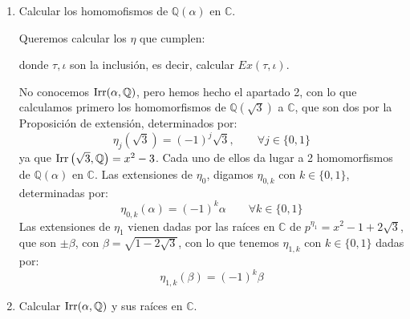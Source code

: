 \begin{ejercicio}
\begin{enumerate}
            Los únicos posibles racionales son $\pm 1$ y $\pm 3$, que no son raíces del polinomio, por lo que no hay solución en $\mathbb{Q}$. Como el cuadrado de un racional es un racional, no hay solución en $\mathbb{Q}$. Por tanto, $\alpha\notin \mathbb{Q}\left(\sqrt{3}\right)$, luego $\left[\mathbb{Q}(\alpha):\mathbb{Q}\left(\sqrt{3}\right)\right]\neq 1$. Por tanto:
            $$\left[\mathbb{Q}(\alpha):\mathbb{Q}\left(\sqrt{3}\right)\right] = 2$$
            y $\Irr\left(\alpha,\mathbb{Q}\left(\sqrt{3}\right)\right) = x^2-1-2\sqrt{3}$.
            
        \item Calcular los homomofismos de $\mathbb{Q}(\alpha)$ en $\mathbb{C}$.

            Queremos calcular los $\eta$ que cumplen:
            \begin{figure}[H]
                \centering
            \end{figure}
            donde $\tau,\iota$ son la inclusión, es decir, calcular $Ex(\tau,\iota)$.

            No conocemos $\operatorname{Irr}(\alpha,\mathbb{Q})$, pero hemos hecho el apartado 2, con lo que calculamos primero los homomorfismos de $\mathbb{Q}(\sqrt{3})$ a $\mathbb{C}$, que son dos por la Proposición de extensión, determinados por:
            \begin{equation*}
                \eta_j(\sqrt{3}) = {(-1)}^{j}\sqrt{3}, \qquad \forall j\in \{0,1\}
            \end{equation*}
            ya que $\operatorname{Irr}\left(\sqrt{3},\mathbb{Q}\right) = x^2-3$. Cada uno de ellos da lugar a 2 homomorfismos de $\mathbb{Q}(\alpha)$ en $\mathbb{C}$. Las extensiones de $\eta_0$, digamos $\eta_{0,k}$ con $k\in \{0,1\}$, determinadas por:
            \begin{equation*}
                \eta_{0,k}(\alpha) = {(-1)}^{k}\alpha \qquad \forall k\in \{0,1\}
            \end{equation*}
            Las extensiones de $\eta_1$ vienen dadas por las raíces en $\mathbb{C}$ de $p^{\eta_1} = x^2-1+2\sqrt{3}$, que son $\pm \beta$, con $\beta = \sqrt{1-2\sqrt{3}}$, con lo que tenemos $\eta_{1,k}$ con $k\in \{0,1\}$ dadas por:
            \begin{equation*}
                \eta_{1,k}(\beta) = {(-1)}^{k}\beta
            \end{equation*}
        \item Calcular $\operatorname{Irr}(\alpha,\mathbb{Q})$ y sus raíces en $\mathbb{C}$. %


\end{enumerate}
\end{ejercicio}
